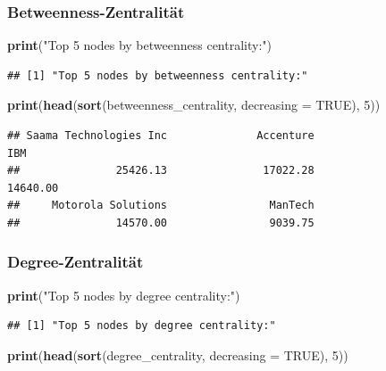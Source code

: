 \documentclass[
]{article}
\newenvironment{Shaded}{\begin{snugshade}}{\end{snugshade}}
\newcommand{\AttributeTok}[1]{\textcolor[rgb]{0.13,0.29,0.53}{#1}}
\newcommand{\ConstantTok}[1]{\textcolor[rgb]{0.56,0.35,0.01}{#1}}
\newcommand{\DecValTok}[1]{\textcolor[rgb]{0.00,0.00,0.81}{#1}}
\newcommand{\FunctionTok}[1]{\textcolor[rgb]{0.13,0.29,0.53}{\textbf{#1}}}
\newcommand{\NormalTok}[1]{#1}
\newcommand{\StringTok}[1]{\textcolor[rgb]{0.31,0.60,0.02}{#1}}
\begin{document}
\subsubsection{Betweenness-Zentralität}\label{betweenness-zentralituxe4t}

\begin{Shaded}
\begin{Highlighting}[]
\FunctionTok{print}\NormalTok{(}\StringTok{"Top 5 nodes by betweenness centrality:"}\NormalTok{)}
\end{Highlighting}
\end{Shaded}

\begin{verbatim}
## [1] "Top 5 nodes by betweenness centrality:"
\end{verbatim}

\begin{Shaded}
\begin{Highlighting}[]
\FunctionTok{print}\NormalTok{(}\FunctionTok{head}\NormalTok{(}\FunctionTok{sort}\NormalTok{(betweenness\_centrality, }\AttributeTok{decreasing =} \ConstantTok{TRUE}\NormalTok{), }\DecValTok{5}\NormalTok{))}
\end{Highlighting}
\end{Shaded}

\begin{verbatim}
## Saama Technologies Inc              Accenture                    IBM 
##               25426.13               17022.28               14640.00 
##     Motorola Solutions                ManTech 
##               14570.00                9039.75
\end{verbatim}

\subsubsection{Degree-Zentralität}\label{degree-zentralituxe4t}

\begin{Shaded}
\begin{Highlighting}[]
\FunctionTok{print}\NormalTok{(}\StringTok{"Top 5 nodes by degree centrality:"}\NormalTok{)}
\end{Highlighting}
\end{Shaded}

\begin{verbatim}
## [1] "Top 5 nodes by degree centrality:"
\end{verbatim}

\begin{Shaded}
\begin{Highlighting}[]
\FunctionTok{print}\NormalTok{(}\FunctionTok{head}\NormalTok{(}\FunctionTok{sort}\NormalTok{(degree\_centrality, }\AttributeTok{decreasing =} \ConstantTok{TRUE}\NormalTok{), }\DecValTok{5}\NormalTok{))}
\end{Highlighting}
\end{Shaded}
\end{document}
